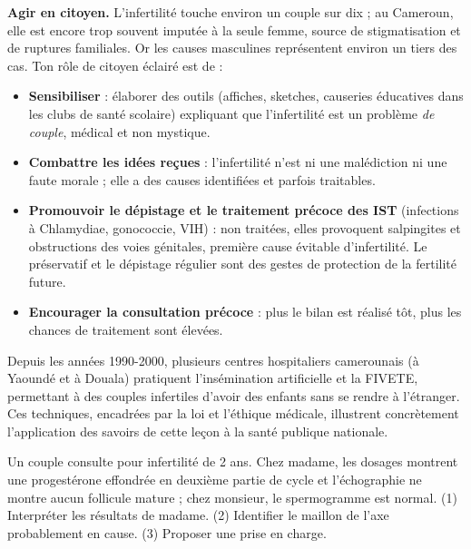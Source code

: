 \documentclass[11pt]{article}
\begin{document}
\textbf{Agir en citoyen.} L'infertilité touche environ un couple sur dix ; au Cameroun, elle est encore trop souvent imputée à la seule femme, source de stigmatisation et de ruptures familiales. Or les causes masculines représentent environ un tiers des cas. Ton rôle de citoyen éclairé est de :

\begin{itemize}
\item \textbf{Sensibiliser} : élaborer des outils (affiches, sketches, causeries éducatives dans les clubs de santé scolaire) expliquant que l'infertilité est un problème \emph{de couple}, médical et non mystique.
\item \textbf{Combattre les idées reçues} : l'infertilité n'est ni une malédiction ni une faute morale ; elle a des causes identifiées et parfois traitables.
\item \textbf{Promouvoir le dépistage et le traitement précoce des IST} (infections à Chlamydiae, gonococcie, VIH) : non traitées, elles provoquent salpingites et obstructions des voies génitales, première cause évitable d'infertilité. Le préservatif et le dépistage régulier sont des gestes de protection de la fertilité future.
\item \textbf{Encourager la consultation précoce} : plus le bilan est réalisé tôt, plus les chances de traitement sont élevées.
\end{itemize}

\begin{savaistu}
Depuis les années 1990-2000, plusieurs centres hospitaliers camerounais (à Yaoundé et à Douala) pratiquent l'insémination artificielle et la FIVETE, permettant à des couples infertiles d'avoir des enfants sans se rendre à l'étranger. Ces techniques, encadrées par la loi et l'éthique médicale, illustrent concrètement l'application des savoirs de cette leçon à la santé publique nationale.
\end{savaistu}

\begin{exercice}
Un couple consulte pour infertilité de 2 ans. Chez madame, les dosages montrent une progestérone effondrée en deuxième partie de cycle et l'échographie ne montre aucun follicule mature ; chez monsieur, le spermogramme est normal. (1) Interpréter les résultats de madame. (2) Identifier le maillon de l'axe probablement en cause. (3) Proposer une prise en charge.
\end{exercice}
\end{document}
